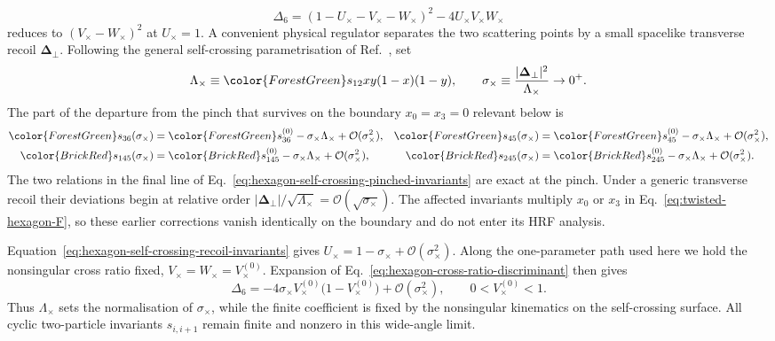 \documentclass[a4paper,11pt]{article}
\newcommand{\PosInv}[1]{{\color{ForestGreen}#1}}
\newcommand{\NegInv}[1]{{\color{BrickRed}#1}}
\begin{document}
\begin{equation}
 \Delta_6=(1-U_\times-V_\times-W_\times)^2
           -4U_\times V_\times W_\times
 \label{eq:hexagon-cross-ratio-discriminant}
\end{equation}
reduces to \((V_\times-W_\times)^2\) at \(U_\times=1\).  A convenient
physical regulator separates the two scattering points by a small spacelike
transverse recoil \(\boldsymbol\Delta_\perp\).  Following the general
self-crossing parametrisation of Ref.~\cite{Dixon:2016selfcross}, set
\begin{equation}
 \Lambda_\times\equiv \PosInv{s_{12}}xy(1-x)(1-y),\qquad
 \sigma_\times\equiv
 \frac{|\boldsymbol\Delta_\perp|^2}{\Lambda_\times}\to0^+ .
 \label{eq:hexagon-self-crossing-expansion}
\end{equation}
The part of the departure from the pinch that survives on the boundary
\(x_0=x_3=0\) relevant below is
\begin{align}
 \PosInv{s_{36}(\sigma_\times)}
 &=\PosInv{s_{36}^{(0)}}-\sigma_\times\Lambda_\times
   +\mathcal O(\sigma_\times^2),&
 \PosInv{s_{45}(\sigma_\times)}
 &=\PosInv{s_{45}^{(0)}}-\sigma_\times\Lambda_\times
   +\mathcal O(\sigma_\times^2),\nonumber\\
 \NegInv{s_{145}(\sigma_\times)}
 &=\NegInv{s_{145}^{(0)}}-\sigma_\times\Lambda_\times
   +\mathcal O(\sigma_\times^2),&
 \NegInv{s_{245}(\sigma_\times)}
 &=\NegInv{s_{245}^{(0)}}-\sigma_\times\Lambda_\times
   +\mathcal O(\sigma_\times^2).
 \label{eq:hexagon-self-crossing-recoil-invariants}
\end{align}
The two relations in the final line of
Eq.~\eqref{eq:hexagon-self-crossing-pinched-invariants} are exact at the
pinch.  Under a generic transverse recoil their deviations begin at
relative order
\(|\boldsymbol\Delta_\perp|/\sqrt{\Lambda_\times}
=\mathcal O(\sqrt{\sigma_\times})\).  The affected invariants multiply
\(x_0\) or \(x_3\) in Eq.~\eqref{eq:twisted-hexagon-F}, so these earlier
corrections vanish identically on the boundary and do not enter its HRF
analysis.

Equation~\eqref{eq:hexagon-self-crossing-recoil-invariants} gives
\(U_\times=1-\sigma_\times+\mathcal O(\sigma_\times^2)\).  Along the
one-parameter path used here we hold the nonsingular cross ratio fixed,
\(V_\times=W_\times=V_\times^{(0)}\).  Expansion of
Eq.~\eqref{eq:hexagon-cross-ratio-discriminant} then gives
\[
 \Delta_6=-4\sigma_\times V_\times^{(0)}
 \bigl(1-V_\times^{(0)}\bigr)+\mathcal O(\sigma_\times^2),
 \qquad 0<V_\times^{(0)}<1.
\]
Thus \(\Lambda_\times\) sets the normalisation of \(\sigma_\times\), while
the finite coefficient is fixed by the nonsingular kinematics on the
self-crossing surface.  All cyclic two-particle invariants \(s_{i,i+1}\)
remain finite and nonzero in this wide-angle limit.
\end{document}
